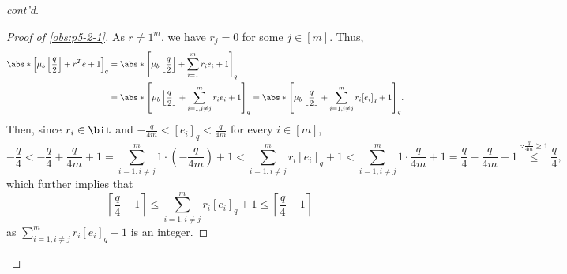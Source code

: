 \begin{answer}[ii]
\begin{proof}[cont'd]
\begin{proof}[Proof of \autoref{obs:p5-2-1}]
            As $r\neq 1^m$, we have $r_j=0$ for some $j\in [m]$. Thus, 
            \begin{align}\label{eq:p5-2-6}
                \abs*{\left[\mu_b\left\lfloor \frac{q}{2}\right\rfloor+ r^Te+1 \right]_q}
                &=\abs*{\left[\mu_b\left\lfloor \frac{q}{2}\right\rfloor+ \sum_{i=1}^m r_ie_i +1 \right]_q}
                \notag\\&=\abs*{\left[\mu_b\left\lfloor \frac{q}{2}\right\rfloor+ \sum_{i=1, i\neq j}^m r_ie_i +1 \right]_q}
                = \abs*{\left[\mu_b\left\lfloor \frac{q}{2}\right\rfloor+ \sum_{i=1, i\neq j}^m r_i[e_i]_q + 1 \right]_q}.
            \end{align}
            Then, since $r_i\in\bit$ and $-\frac{q}{4m}\lt [e_i]_q\lt \frac{q}{4m}$ for every $i\in [m]$,
            \[
                -\frac{q}{4}
                \lt -\frac{q}{4} +\frac{q}{4m}+1
                = \sum_{i=1, i\neq j}^m 1 \cdot \left(- \frac{q}{4m}\right)+1
                \lt \sum_{i=1, i\neq j}^m r_i[e_i]_q +1
                \lt \sum_{i=1, i\neq j}^m 1 \cdot \frac{q}{4m}+1
                = \frac{q}{4} -\frac{q}{4m}+1
                \stackrel{\because \frac{q}{4m}\ge 1}\le \frac{q}{4},
            \]
             which further implies that 
            \begin{equation}\label{eq:p5-2-4}
                -\left\lceil\frac{q}{4}-1\right\rceil\le \sum_{i=1, i\neq j}^m r_i[e_i]_q +1 \le \left\lceil\frac{q}{4}-1\right\rceil
            \end{equation}
            as $\sum_{i=1, i\neq j}^m r_i[e_i]_q +1$ is an integer.


\end{proof}
\end{proof}
\end{answer}
